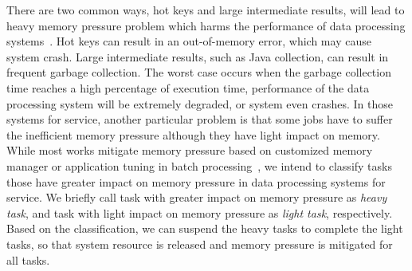 There are two common ways, hot keys and large intermediate results, will lead to heavy memory pressure problem which harms the performance of data processing systems~\cite{fang2015interruptible}. Hot keys can result in an out-of-memory error, which may cause system crash. Large intermediate results, such as Java collection, can result in frequent garbage collection. The worst case occurs when the garbage collection time reaches a high percentage of execution time, performance of the data processing system will be extremely degraded, or system even crashes. In those systems for service, another particular problem is that some jobs have to suffer the inefficient memory pressure although they have light impact on memory. While most works mitigate memory pressure based on customized memory manager or application tuning in batch processing~\cite{www:spark-tuning, nguyen2015facade, fang2015interruptible, lulu:deca, nguyen:yak}, we intend to classify tasks those have greater impact on memory pressure in data processing systems for service. We briefly call task with greater impact on memory pressure as \textit{heavy task}, and task with light impact on memory pressure as \textit{light task}, respectively. Based on the classification, we can suspend the heavy tasks to complete the light tasks, so that system resource is released and memory pressure is mitigated for all tasks.


